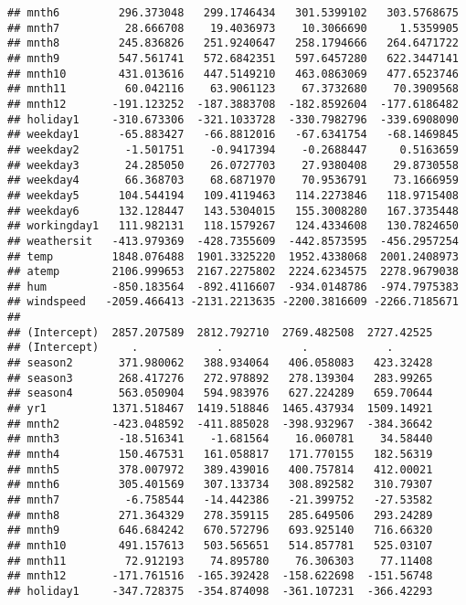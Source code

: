 \documentclass[]{article}
\begin{document}
\begin{verbatim}
## mnth6         296.373048   299.1746434   301.5399102   303.5768675
## mnth7          28.666708    19.4036973    10.3066690     1.5359905
## mnth8         245.836826   251.9240647   258.1794666   264.6471722
## mnth9         547.561741   572.6842351   597.6457280   622.3447141
## mnth10        431.013616   447.5149210   463.0863069   477.6523746
## mnth11         60.042116    63.9061123    67.3732680    70.3909568
## mnth12       -191.123252  -187.3883708  -182.8592604  -177.6186482
## holiday1     -310.673306  -321.1033728  -330.7982796  -339.6908090
## weekday1      -65.883427   -66.8812016   -67.6341754   -68.1469845
## weekday2       -1.501751    -0.9417394    -0.2688447     0.5163659
## weekday3       24.285050    26.0727703    27.9380408    29.8730558
## weekday4       66.368703    68.6871970    70.9536791    73.1666959
## weekday5      104.544194   109.4119463   114.2273846   118.9715408
## weekday6      132.128447   143.5304015   155.3008280   167.3735448
## workingday1   111.982131   118.1579267   124.4334608   130.7824650
## weathersit   -413.979369  -428.7355609  -442.8573595  -456.2957254
## temp         1848.076488  1901.3325220  1952.4338068  2001.2408973
## atemp        2106.999653  2167.2275802  2224.6234575  2278.9679038
## hum          -850.183564  -892.4116607  -934.0148786  -974.7975383
## windspeed   -2059.466413 -2131.2213635 -2200.3816609 -2266.7185671
##                                                               
## (Intercept)  2857.207589  2812.792710  2769.482508  2727.42525
## (Intercept)     .            .            .            .      
## season2       371.980062   388.934064   406.058083   423.32428
## season3       268.417276   272.978892   278.139304   283.99265
## season4       563.050904   594.983976   627.224289   659.70644
## yr1          1371.518467  1419.518846  1465.437934  1509.14921
## mnth2        -423.048592  -411.885028  -398.932967  -384.36642
## mnth3         -18.516341    -1.681564    16.060781    34.58440
## mnth4         150.467531   161.058817   171.770155   182.56319
## mnth5         378.007972   389.439016   400.757814   412.00021
## mnth6         305.401569   307.133734   308.892582   310.79307
## mnth7          -6.758544   -14.442386   -21.399752   -27.53582
## mnth8         271.364329   278.359115   285.649506   293.24289
## mnth9         646.684242   670.572796   693.925140   716.66320
## mnth10        491.157613   503.565651   514.857781   525.03107
## mnth11         72.912193    74.895780    76.306303    77.11408
## mnth12       -171.761516  -165.392428  -158.622698  -151.56748
## holiday1     -347.728375  -354.874098  -361.107231  -366.42293

\end{verbatim}
\end{document}
